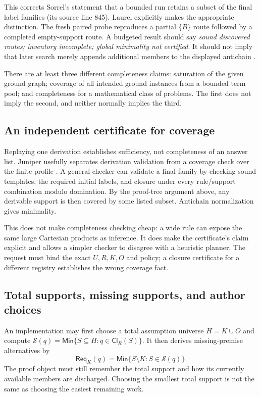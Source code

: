 \documentclass[11pt,letterpaper]{article}
\newcommand{\Req}{\mathsf{Req}}\newcommand{\Cl}{\mathsf{Cl}}
\newcommand{\Min}{\mathsf{Min}}\newcommand{\obs}{\mathsf{obs}}
\theoremstyle{definition}\newtheorem{definition}[proposition]{Definition}
\theoremstyle{remark}\newtheorem{remark}[proposition]{Remark}
\begin{document}
This corrects Sorrel's statement that a bounded run retains a subset of the
final label families (its source line 845). Laurel explicitly makes the
appropriate distinction. The fresh paired probe reproduces a partial
$\{B\}$ route followed by a completed empty-support route. A budgeted result
should say \emph{sound discovered routes; inventory incomplete; global
minimality not certified}. It should not imply that later search merely
appends additional members to the displayed antichain \cite{laurel,sorrel}.

There are at least three different completeness claims: saturation of the
given ground graph; coverage of all intended ground instances from a bounded
term pool; and completeness for a mathematical class of problems. The first
does not imply the second, and neither normally implies the third.

\subsection{An independent certificate for coverage}

Replaying one derivation establishes sufficiency, not completeness of an
answer list. Juniper usefully separates derivation validation from a
coverage check over the finite profile \cite{juniper}. A general checker
can validate a final family by checking sound templates, the required initial
labels, and closure under every rule/support combination modulo domination.
By the proof-tree argument above, any derivable support is then covered by
some listed subset. Antichain normalization gives minimality.

This does not make completeness checking cheap: a wide rule can expose the
same large Cartesian products as inference. It does make the certificate's
claim explicit and allows a simpler checker to disagree with a heuristic
planner. The request must bind the exact $U,R,K,O$ and policy; a closure
certificate for a different registry establishes the wrong coverage fact.

\subsection{Total supports, missing supports, and author choices}

An implementation may first choose a total assumption universe $H=K\cup O$
and compute $\mathcal S(q)=\Min\{S\subseteq H:q\in\Cl_R(S)\}$. It then
derives missing-premise alternatives by
\[
 \Req_K(q)=\Min\{S\setminus K:S\in\mathcal S(q)\}.
\]
The proof object must still remember the total support and how its currently
available members are discharged. Choosing the smallest total support is
not the same as choosing the easiest remaining work.
\end{document}
